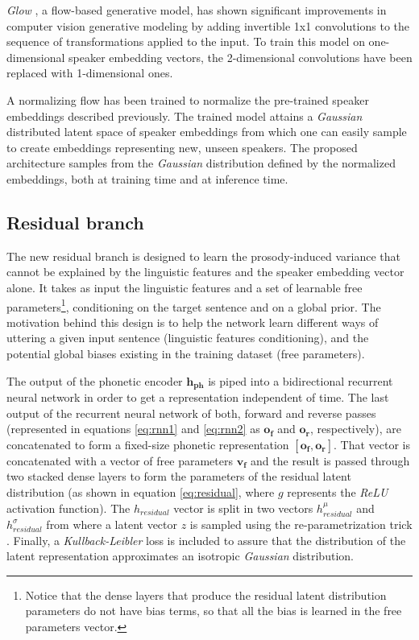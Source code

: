 \textit{Glow} \autocite{kingma2018}, a flow-based generative model, has shown significant improvements in computer vision generative modeling by adding invertible 1x1 convolutions to the sequence of transformations applied to the input. To train this model on one-dimensional speaker embedding vectors, the 2-dimensional convolutions have been replaced with 1-dimensional ones.

A normalizing flow has been trained to normalize the pre-trained speaker embeddings described previously. The trained model attains a \textit{Gaussian} distributed latent space of speaker embeddings from which one can easily sample to create embeddings representing new, unseen speakers. The proposed architecture samples from the \textit{Gaussian} distribution defined by the normalized embeddings, both at training time and at inference time.


\subsection{Residual branch}
The new residual branch is designed to learn the prosody-induced variance that cannot be explained by the linguistic features and the speaker embedding vector alone. It takes as input the linguistic features and a set of learnable free parameters\footnote{Notice that the dense layers that produce the residual latent distribution parameters do not have bias terms, so that all the bias is learned in the free parameters vector.}, conditioning on the target sentence and on a global prior. The motivation behind this design is to help the network learn different ways of uttering a given input sentence (linguistic features conditioning), and the potential global biases existing in the training dataset (free parameters).

The output of the phonetic encoder $\mathbf{h_{\text{ph}}}$ is piped into a bidirectional recurrent neural network \autocite{schuster1997,graves2005} in order to get a representation independent of time. The last output of the recurrent neural network of both, forward and reverse passes (represented in equations \ref{eq:rnn1} and \ref{eq:rnn2} as $\mathbf{o_f}$ and $\mathbf{o_r}$, respectively), are  concatenated to form a fixed-size phonetic representation $[\mathbf{o_f}, \mathbf{o_r}]$. That vector is concatenated with a vector of free parameters $\mathbf{v_f}$ and the result is passed through two stacked dense layers to form the parameters of the residual latent distribution (as shown in equation \ref{eq:residual}, where $g$ represents the \textit{ReLU} activation function). The $h_{residual}$ vector is split in two vectors $h_{residual}^{\mu}$ and $h_{residual}^{\sigma}$ from where a latent vector $z$ is sampled using the re-parametrization trick \autocite{kingma2019}. Finally, a \textit{Kullback-Leibler} loss is included to assure that the distribution of the latent representation approximates an isotropic \textit{Gaussian} distribution.

